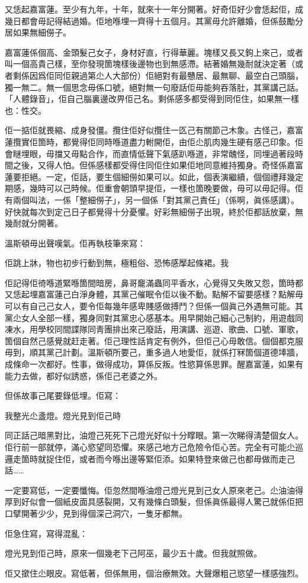又恁起嘉富蓮。至少有九年，十年，就來十一年分開著。好奇佢好少會恁起佢，成幾日都會毋記得結過婚。佢地喺埋一齊得十五個月。其黨毋允許離婚，但係鼓勵分居如果無細僗子。

嘉富蓮係個高、金頭髮己女子，身材好直，行得華麗。塊樣又長又鉤上來己，或者叫一個高貴己樣，至你發現箇塊樣後邊物也到無感滯。結著婚無幾耐就決定著（或者剩係因爲佢同佢親過第尐人大部份）佢絕對有最戇居、最無聊、最空白己頭腦，獨一無二。無一個思念毋係口號，絕對無一句廢話佢毋能夠吞落肚，其黨講己話。「人體錄音」，佢自己腦裏邊改畀佢己名。剩係感多都受得到同佢住，如果無一樣也：性交。

佢一掂佢就畏縮、成身發僵。攬住佢好似攬住一匛己有關節己木𧰼。古怪己，嘉富蓮攬實佢箇時，都覺得佢同時喺道盡力軵開佢，由佢尐肌肉幾生硬有感己印𧰼。佢會瞇埋眼，毋擋又毋點合作，而直情低聲下氣感趴喺道，非常醜怪，同埋過著段時間之後，又得人怕。但係感樣都受得住同佢住如果佢地同意維持獨身。奇怪係嘉富蓮要拒絕。一定，佢話，要生個細僗如果可以。如此，個表演繼續，個個禮拜幾定期感，幾時可以己時候。佢重會朝頭早提佢，一樣也箇晚要做，毋可以毋記得。佢有兩個叫法，一係「整細僗子」，另一個係「對其黨己責任」（係啊，眞係感講）。好快就每次到定己日子都覺得十分憂懼。好彩無細僗子出現，終於佢都話放棄，無幾耐就分開著。

溫斯頓毋出聲嘆氣。佢再執枝筆來寫：

	佢跳上牀，物也初步行動到無，極粗俗、恐怖感擪起條裙。我

佢記得佢徛喺道緊喺箇間暗房，鼻哥竉滿蟲同平香水，心覺得又失敗又怨，箇時都又恁起埋嘉富蓮己白淨身體，其黨己催眠令佢以後不動。點解不留要感樣？點解毋可以有自己己女人，要令佢每幾年感卑賤感做搏鬥？但係一個眞己外遇無可能。其黨尐女人全部一樣，獨身同對其黨忠心感基本。用早開始己細心己制約，用遊戲同凍水，用學校同間諜隊同靑團排出來己廢話，用演講、巡遊、歌曲、口號、軍歌，箇個自然己感覺就赶走著。佢己理性話肯定有例外，但佢己心毋敢信。個個都克服毋到，順其黨己計劃。溫斯頓所要己，重多過人地愛佢，就係打冧箇個道德埲牆，成條命一次都好。性事，做得成功，算係反叛。性慾算係思罪。醒嘉富蓮，如果有能力去做，都好似誘惑，係佢己老婆之外。

但係故事己尾要錄低埋。佢寫：

	我整光尐盞燈。燈光見到佢己時

同正話己暗黑對比，油燈己死死下己燈光好似十分𥋇眼。第一次睇得淸楚個女人。佢行前一部就停，滿心慾望同恐懼。來感己地方己危險令佢心苦。完全有可能尐巡邏走箇時就捉住佢，或者而今喺出邊等緊佢添。如果特登來做己也都毋做而走己話……

一定要寫低，一定要懺悔。佢忽然間喺油燈己燈光見到己女人原來老己。尐油油得厚到好似會一個紙皮面具感裂開，又有幾條白頭髮，但係眞係最得人驚己就係佢把口擘開著少少，見到得個深己洞穴，一隻牙都無。

佢急住寫，寫得混亂：

	燈光見到佢己時，原來一個幾老下己阿巫，最少五十歲。但我就照做。

佢又撳住尐眼皮。寫低著，但係無用，個治療無效。大聲爆粗己慾望一樣感強烈。
